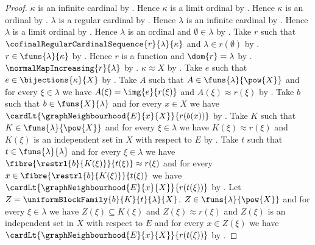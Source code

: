 \begin{proof}
    $\kappa$ is an infinite cardinal by .
    Hence $\kappa$ is a limit ordinal by
        .
    Hence $\kappa$ is an ordinal by .
    $\lambda$ is a regular cardinal by
        .
    Hence $\lambda$ is an infinite cardinal by .
    Hence $\lambda$ is a limit ordinal by
        .
    Hence $\lambda$ is an ordinal and $\emptyset\in\lambda$ by
        .
    Take $r$ such that
        $\cofinalRegularCardinalSequence{r}{\lambda}{\kappa}$ and
        $\lambda\in r(\emptyset)$ by
        .
    $r\in\funs{\lambda}{\kappa}$ by
        .
    Hence $r$ is a function and $\dom{r}=\lambda$ by
        .
    $\normalMapIncreasing{r}{\lambda}$ by
        .
    $\kappa\approx X$ by .
    Take $e$ such that $e\in\bijections{\kappa}{X}$ by .
    Take $A$ such that $A\in\funs{\lambda}{\pow{X}}$ and
        for every $\xi\in\lambda$ we have
            $A(\xi)=\img{e}{r(\xi)}$ and $A(\xi)\approx r(\xi)$ by
        .
    Take $b$ such that $b\in\funs{X}{\lambda}$ and
        for every $x\in X$ we have
            $\cardLt{\graphNeighbourhood{E}{x}{X}}{r(b(x))}$ by
        .
    Take $K$ such that $K\in\funs{\lambda}{\pow{X}}$ and
        for every $\xi\in\lambda$ we have $K(\xi)\approx r(\xi)$ and
            $K(\xi)$ is an independent set in $X$ with respect to $E$ by
        .
    Take $t$ such that $t\in\funs{\lambda}{\lambda}$ and
        for every $\xi\in\lambda$ we have
            $\fibre{\restrl{b}{K(\xi)}}{t(\xi)}\approx r(\xi)$ and
            for every
                $x\in\fibre{\restrl{b}{K(\xi)}}{t(\xi)}$ we have
                $\cardLt{\graphNeighbourhood{E}{x}{X}}{r(t(\xi))}$ by
        .
    Let $Z=\uniformBlockFamily{b}{K}{t}{\lambda}{X}$.
    $Z\in\funs{\lambda}{\pow{X}}$ and for every $\xi\in\lambda$
        we have $Z(\xi)\subseteq K(\xi)$ and $Z(\xi)\approx r(\xi)$ and
        $Z(\xi)$ is an independent set in $X$ with respect to $E$ and
        for every $x\in Z(\xi)$ we have
            $\cardLt{\graphNeighbourhood{E}{x}{X}}{r(t(\xi))}$ by
        .

\end{proof}
